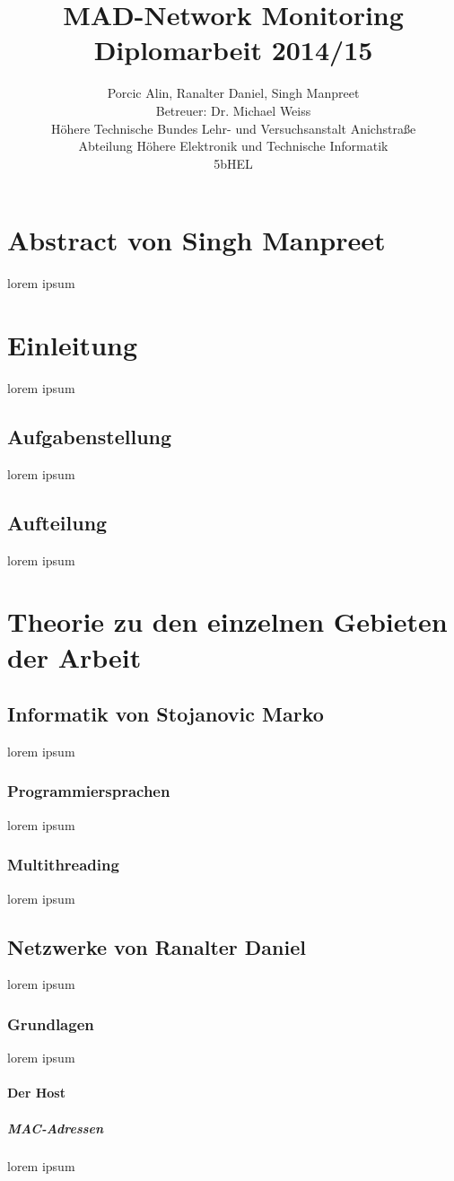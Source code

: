 \documentclass[10pt,a4paper]{report}
\title{MAD-Network Monitoring\\
Diplomarbeit 2014/15}
\author{Porcic Alin, Ranalter Daniel, Singh Manpreet\\
Betreuer: Dr. Michael Weiss\\
Höhere Technische Bundes Lehr- und Versuchsanstalt Anichstraße\\
Abteilung Höhere Elektronik und Technische Informatik\\
5bHEL}
\begin{document}
\maketitle
\tableofcontents
\newpage
\chapter{Abstract von Singh Manpreet}
lorem ipsum
\chapter{Einleitung}
lorem ipsum
\section{Aufgabenstellung}
lorem ipsum
\section{Aufteilung}
lorem ipsum 
\chapter{Theorie zu den einzelnen Gebieten der Arbeit}
\section{Informatik von Stojanovic Marko}
lorem ipsum
\subsection{Programmiersprachen}
lorem ipsum
\subsection{Multithreading}
lorem ipsum
\section{Netzwerke von Ranalter Daniel}
lorem ipsum
\subsection{Grundlagen}
lorem ipsum
\subsubsection{Der Host}
\paragraph{MAC-Adressen}
lorem ipsum
\end{document}
